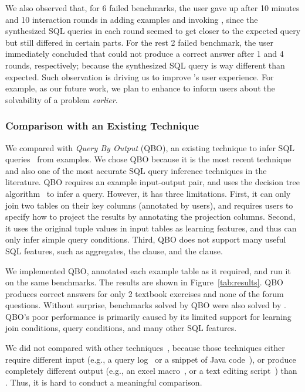 We also observed that,
for 6 failed benchmarks, the user
gave up after 10 minutes and
10 interaction rounds in adding
examples and invoking \ourtool, since the synthesized
SQL queries in each round seemed to get closer to the expected
query but still differed in certain parts.
For the rest 2 failed benchmark, the user immediately
concluded that \ourtool could not produce a correct
answer after 1 and 4 rounds, respectively;
because the synthesized SQL
query is way different than expected.
Such observation is driving us to improve \ourtool's
user experience. For example, as our future work,
we plan to enhance \ourtool to inform users
about the solvability of a problem
\textit{earlier}.



\subsubsection{Comparison with an Existing Technique}
\label{sec:comparison}
We compared \ourtool with \textit{Query By Output} (QBO), an
existing technique to infer SQL queries~\cite{Tran:2009} from examples.
We chose QBO because it is the most recent technique and also one
of the most accurate SQL query inference techniques in
the literature. QBO requires an example input-output pair, and
uses the decision tree algorithm~\cite{Quinlan:1986} to infer a query.
However, it
has three limitations. First, 
it can only join two tables on their key columns (annotated by users), and requires
users to specify how to project the results
by annotating the projection columns.
Second, it uses the original tuple values
in input tables as learning features, and thus can only
infer simple query conditions. Third, QBO does not support
many useful SQL features, such as aggregates, the 
clause, and the  clause.

We implemented QBO, annotated
each example table as it required, and run it
on the same benchmarks. The results are shown in Figure~\ref{tab:results}.
QBO produces correct answers
for only 2 textbook exercises and none of the forum questions.
Without surprise, 
benchmarks solved by QBO were also solved by \ourtool.
QBO's poor performance is primarily caused by its
limited support for learning join conditions,
query conditions, and many other SQL features.

We did not compared \ourtool with other techniques~\cite{Howe:2011,
abs-1208-2013, Harris:2011, Kandel:2011}, because
those techniques either require different input
(e.g., a query log~\cite{Khoussainova:2010, Howe:2011}
or a snippet of Java code~\cite{abs-1208-2013}), 
or produce completely different
output (e.g., an excel macro~\cite{Harris:2011}, or a
text editing script~\cite{Kandel:2011}) than \ourtool.
Thus, it is hard to conduct a meaningful comparison.

